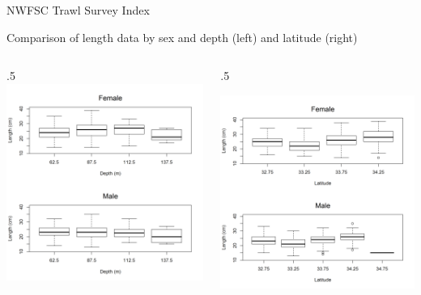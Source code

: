 \documentclass[ignorenonframetext,]{beamer}
\def\begincols{\begin{columns}}
\def\begincol{\begin{column}}
\def\endcol{\end{column}}
\def\endcols{\end{columns}}
\begin{document}
\begin{frame}{NWFSC Trawl Survey Index}

Comparison of length data by sex and depth (left) and latitude (right)
\begincols
 \begincol{.5\textwidth}
\includegraphics{Figures/NWFSCtrawl_lengthdepth.png}

\endcol
 \begincol{.5\textwidth}

\includegraphics{Figures/NWFSCtrawl_lengthlat.png}

\endcol
\endcols

\end{frame}
\end{document}
